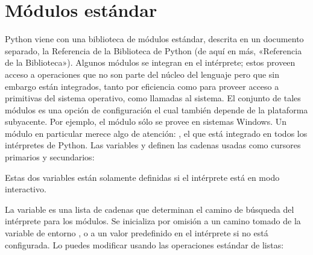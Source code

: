\documentclass[a5paper,10pt,spanish]{sphinxmanual}
\begin{document}
\section{Módulos estándar}
\label{\detokenize{tutorial/modules:standard-modules}}\label{\detokenize{tutorial/modules:tut-standardmodules}}
\ignorespaces 
\sphinxAtStartPar
Python viene con una biblioteca de módulos estándar, descrita en un documento separado, la Referencia de la Biblioteca de Python (de aquí en más, «Referencia de la Biblioteca»).  Algunos módulos se integran en el intérprete; estos proveen acceso a operaciones que no son parte del núcleo del lenguaje pero que sin embargo están integrados, tanto por eficiencia como para proveer acceso a primitivas del sistema operativo, como llamadas al sistema.  El conjunto de tales módulos es una opción de configuración el cual también depende de la plataforma subyacente.  Por ejemplo, el módulo  sólo se provee en sistemas Windows.  Un módulo en particular merece algo de atención: , el que está integrado en todos los intérpretes de Python.  Las variables  y  definen las cadenas usadas como cursores primarios y secundarios:

\begin{sphinxVerbatim}[commandchars=\\\{\}]
 
  
\end{sphinxVerbatim}

\sphinxAtStartPar
Estas dos variables están solamente definidas si el intérprete está en modo interactivo.

\sphinxAtStartPar
La variable  es una lista de cadenas que determinan el camino de búsqueda del intérprete para los módulos. Se inicializa por omisión a un camino tomado de la variable de entorno , o a un valor predefinido en el intérprete si  no está configurada. Lo puedes modificar usando las operaciones estándar de listas:
\end{document}
